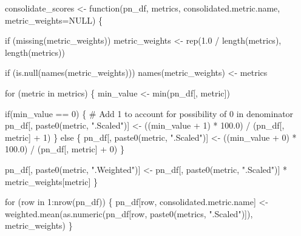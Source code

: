 \documentclass[]{article}
\newenvironment{Shaded}{\begin{snugshade}}{\end{snugshade}}
\newcommand{\KeywordTok}[1]{\textcolor[rgb]{0.94,0.87,0.69}{{#1}}}
\newcommand{\DataTypeTok}[1]{\textcolor[rgb]{0.87,0.87,0.75}{{#1}}}
\newcommand{\DecValTok}[1]{\textcolor[rgb]{0.86,0.86,0.80}{{#1}}}
\newcommand{\FloatTok}[1]{\textcolor[rgb]{0.75,0.75,0.82}{{#1}}}
\newcommand{\StringTok}[1]{\textcolor[rgb]{0.80,0.58,0.58}{{#1}}}
\newcommand{\CommentTok}[1]{\textcolor[rgb]{0.50,0.62,0.50}{{#1}}}
\newcommand{\OtherTok}[1]{\textcolor[rgb]{0.94,0.94,0.56}{{#1}}}
\newcommand{\NormalTok}[1]{\textcolor[rgb]{0.80,0.80,0.80}{{#1}}}
\begin{document}
\begin{Shaded}
\begin{Highlighting}[]
\NormalTok{consolidate_scores <-}\StringTok{ }\NormalTok{function(pn_df, metrics, consolidated.metric.name, }
                               \DataTypeTok{metric_weights=}\OtherTok{NULL}\NormalTok{) \{}
    
    \NormalTok{if (}\KeywordTok{missing}\NormalTok{(metric_weights))}
        \NormalTok{metric_weights <-}\StringTok{ }\KeywordTok{rep}\NormalTok{(}\FloatTok{1.0} \NormalTok{/}\StringTok{ }\KeywordTok{length}\NormalTok{(metrics), }\KeywordTok{length}\NormalTok{(metrics))}
    
    \NormalTok{if (}\KeywordTok{is.null}\NormalTok{(}\KeywordTok{names}\NormalTok{(metric_weights)))}
        \KeywordTok{names}\NormalTok{(metric_weights) <-}\StringTok{ }\NormalTok{metrics}
    
    \NormalTok{for (metric in metrics) \{}
        \NormalTok{min_value <-}\StringTok{ }\KeywordTok{min}\NormalTok{(pn_df[, metric])}
        
        \NormalTok{if(min_value ==}\StringTok{ }\DecValTok{0}\NormalTok{) \{}
            \CommentTok{# Add 1 to account for possibility of 0 in denominator}
            \NormalTok{pn_df[, }\KeywordTok{paste0}\NormalTok{(metric, }\StringTok{".Scaled"}\NormalTok{)] <-}\StringTok{ }
\StringTok{                }\NormalTok{((min_value +}\StringTok{ }\DecValTok{1}\NormalTok{) *}\StringTok{ }\FloatTok{100.0}\NormalTok{) /}\StringTok{ }\NormalTok{(pn_df[, metric] +}\StringTok{ }\DecValTok{1}\NormalTok{)}
        \NormalTok{\} else \{}
            \NormalTok{pn_df[, }\KeywordTok{paste0}\NormalTok{(metric, }\StringTok{".Scaled"}\NormalTok{)] <-}\StringTok{ }
\StringTok{                }\NormalTok{((min_value +}\StringTok{ }\DecValTok{0}\NormalTok{) *}\StringTok{ }\FloatTok{100.0}\NormalTok{) /}\StringTok{ }\NormalTok{(pn_df[, metric] +}\StringTok{ }\DecValTok{0}\NormalTok{)}
        \NormalTok{\}}
        
        \NormalTok{pn_df[, }\KeywordTok{paste0}\NormalTok{(metric, }\StringTok{".Weighted"}\NormalTok{)] <-}\StringTok{ }
\StringTok{            }\NormalTok{pn_df[, }\KeywordTok{paste0}\NormalTok{(metric, }\StringTok{".Scaled"}\NormalTok{)] *}\StringTok{ }\NormalTok{metric_weights[metric]}
    \NormalTok{\}}
    
    \NormalTok{for (row in }\DecValTok{1}\NormalTok{:}\KeywordTok{nrow}\NormalTok{(pn_df)) \{}
        \NormalTok{pn_df[row, consolidated.metric.name] <-}\StringTok{ }
\StringTok{            }\KeywordTok{weighted.mean}\NormalTok{(}\KeywordTok{as.numeric}\NormalTok{(pn_df[row, }\KeywordTok{paste0}\NormalTok{(metrics, }\StringTok{".Scaled"}\NormalTok{)]),}
                          \NormalTok{metric_weights)}
    \NormalTok{\}    }


\end{Highlighting}
\end{Shaded}
\end{document}
